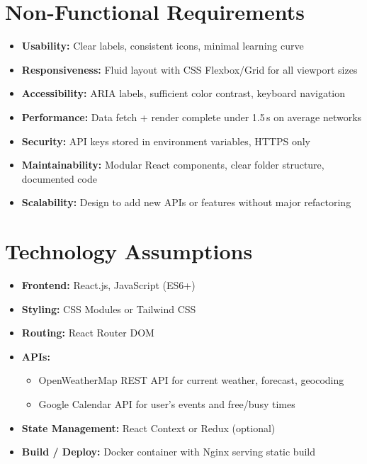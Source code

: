 \documentclass[11pt,a4paper]{article}
\begin{document}
\section{Non-Functional Requirements}
\begin{itemize}[nosep]
  \item \textbf{Usability:} Clear labels, consistent icons, minimal learning curve
  \item \textbf{Responsiveness:} Fluid layout with CSS Flexbox/Grid for all viewport sizes
  \item \textbf{Accessibility:} ARIA labels, sufficient color contrast, keyboard navigation
  \item \textbf{Performance:} Data fetch + render complete under 1.5\,s on average networks
  \item \textbf{Security:} API keys stored in environment variables, HTTPS only
  \item \textbf{Maintainability:} Modular React components, clear folder structure, documented code
  \item \textbf{Scalability:} Design to add new APIs or features without major refactoring
\end{itemize}

\section{Technology Assumptions}
\begin{itemize}[nosep]
  \item \textbf{Frontend:} React.js, JavaScript (ES6+)
  \item \textbf{Styling:} CSS Modules or Tailwind CSS
  \item \textbf{Routing:} React Router DOM
  \item \textbf{APIs:} 
    \begin{itemize}[nosep]
      \item OpenWeatherMap REST API for current weather, forecast, geocoding 
      \item Google Calendar API for user’s events and free/busy times
    \end{itemize}
  \item \textbf{State Management:} React Context or Redux (optional)
  \item \textbf{Build / Deploy:} Docker container with Nginx serving static build
\end{itemize}
\end{document}
